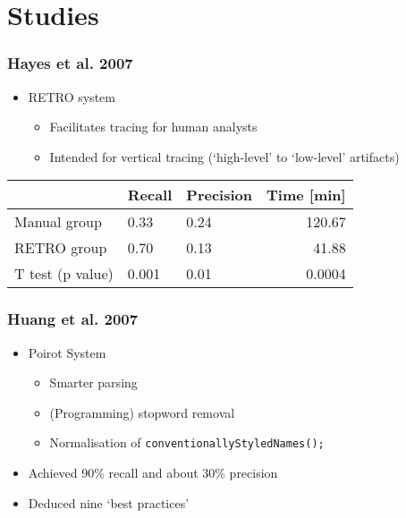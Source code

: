 \documentclass{beamer}
\begin{document}
\section{Studies}
\begin{frame}
\frametitle{Hayes et al. 2007}
\begin{itemize}
\item RETRO system
  \begin{itemize}
  \item Facilitates tracing for human analysts
  \item Intended for vertical tracing (`high-level' to `low-level' artifacts)
  \end{itemize}
\end{itemize}

\begin{table}
\begin{tabular}{l||l|l|r|}
  &Recall&Precision&Time [min]\\\hline\hline
  Manual group&0.33&0.24&120.67\\\hline
  RETRO group&0.70&0.13&41.88\\\hline
  T test (p value)&0.001&0.01&0.0004\\\hline
\end{tabular}
\end{table}

\end{frame}


\begin{frame}
\frametitle{Huang et al. 2007}
\begin{itemize}
\item Poirot System
  \begin{itemize}
  \item Smarter parsing
  \item (Programming) stopword removal
  \item Normalisation of {\tt conventionallyStyledNames();}
  \end{itemize}
\item Achieved 90\% recall and about 30\% precision
\item Deduced nine `best practices'
\end{itemize}
\end{frame}
\end{document}
